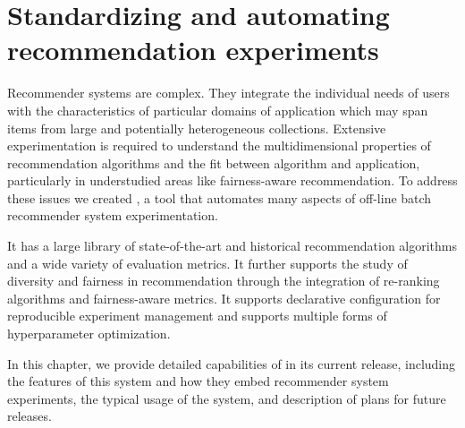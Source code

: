 
\chapter{Standardizing and automating recommendation experiments}
\label{ch:librec-auto}

Recommender systems are complex. They integrate the individual needs of users with the characteristics of particular domains of application which may span items from large and potentially heterogeneous collections. Extensive experimentation is required to understand the multidimensional properties of recommendation algorithms and the fit between algorithm and application, particularly in understudied areas like fairness-aware recommendation. To address these issues we created \libauto{}, a tool that automates many aspects of off-line batch recommender system experimentation.  

It has a large library of state-of-the-art and historical recommendation algorithms and a wide variety of evaluation metrics. It further supports the study of diversity and fairness in recommendation through the integration of re-ranking algorithms and fairness-aware metrics. It supports declarative configuration for reproducible experiment management and supports multiple forms of hyperparameter optimization.




In this chapter, we provide detailed capabilities of \libauto{} in its current release, including the features of this system and how they embed recommender system experiments, the typical usage of the system, and description of plans for future releases.


